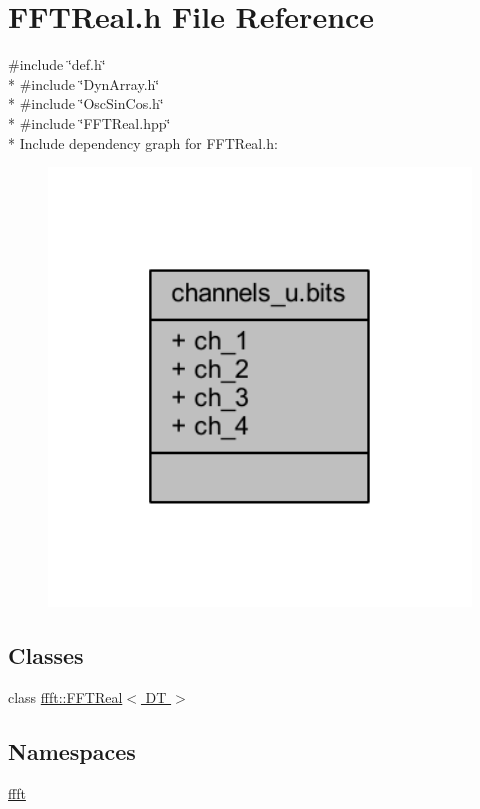 \hypertarget{a00095}{\section{F\+F\+T\+Real.\+h File Reference}
\label{a00095}
}
{\ttfamily \#include \char`\"{}def.\+h\char`\"{}}\\*
{\ttfamily \#include \char`\"{}Dyn\+Array.\+h\char`\"{}}\\*
{\ttfamily \#include \char`\"{}Osc\+Sin\+Cos.\+h\char`\"{}}\\*
{\ttfamily \#include \char`\"{}F\+F\+T\+Real.\+hpp\char`\"{}}\\*
Include dependency graph for F\+F\+T\+Real.\+h\+:
\nopagebreak
\begin{figure}[H]
\begin{center}
\leavevmode
\includegraphics[width=350pt]{d0/def/a00256}
\end{center}
\end{figure}
\subsection*{Classes}
\begin{DoxyCompactItemize}
\item 
class \hyperlink{a00010}{ffft\+::\+F\+F\+T\+Real$<$ D\+T $>$}
\end{DoxyCompactItemize}
\subsection*{Namespaces}
\begin{DoxyCompactItemize}
\item 
 \hyperlink{a00142}{ffft}
\end{DoxyCompactItemize}
